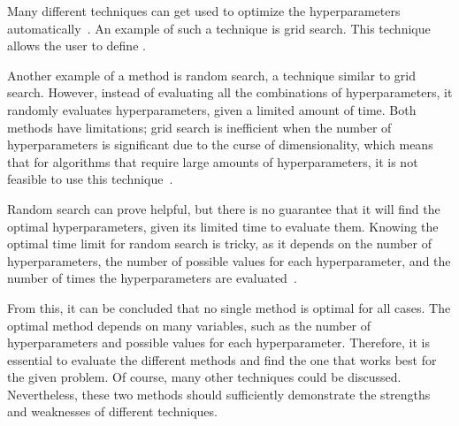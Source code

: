 Many different techniques can get used to optimize the hyperparameters automatically~\cite{automated-machine-learning}. An example of such a technique is grid search. This technique allows the user to define .

Another example of a method is random search, a technique similar to grid search. However, instead of evaluating all the combinations of hyperparameters, it randomly evaluates hyperparameters, given a limited amount of time. Both methods have limitations; grid search is inefficient when the number of hyperparameters is significant due to the curse of dimensionality, which means that for algorithms that require large amounts of hyperparameters, it is not feasible to use this technique~\cite{yang2020hyperparameter}.

Random search can prove helpful, but there is no guarantee that it will find the optimal hyperparameters, given its limited time to evaluate them. Knowing the optimal time limit for random search is tricky, as it depends on the number of hyperparameters, the number of possible values for each hyperparameter, and the number of times the hyperparameters are evaluated~\cite{yang2020hyperparameter}.

From this, it can be concluded that no single method is optimal for all cases. The optimal method depends on many variables, such as the number of hyperparameters and possible values for each hyperparameter. Therefore, it is essential to evaluate the different methods and find the one that works best for the given problem. Of course, many other techniques could be discussed. Nevertheless, these two methods should sufficiently demonstrate the strengths and weaknesses of different techniques.


